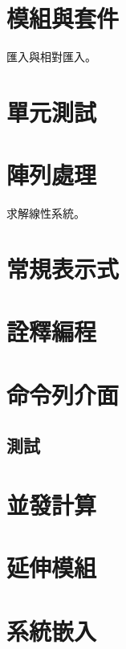 \documentclass[a4paper,12pt]{book}
\theoremstyle{definition}
\begin{document}
\chapter{模組與套件}
%
\label{c:module}

匯入與相對匯入。

\chapter{單元測試}
%
\label{c:unittest}

\chapter{陣列處理}
%
\label{c:array}

求解線性系統。

\chapter{常規表示式}
%
\label{c:regexp}

\chapter{詮釋編程}
%
\label{c:meta}

\chapter{命令列介面}
%
\label{c:cmdline}

\section{測試}

\chapter{並發計算}
%
\label{c:concurrency}

\chapter{延伸模組}
%
\label{c:extension}

\chapter{系統嵌入}
%
\label{c:embed}

\backmatter



\end{document}
